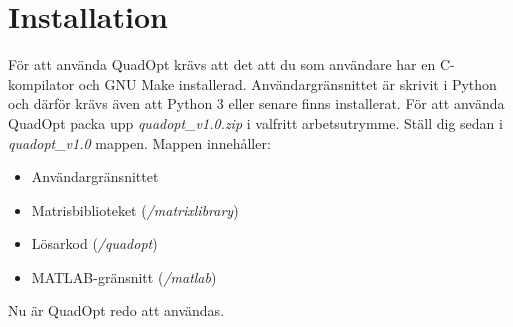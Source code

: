 \section{Installation}
För att använda QuadOpt krävs att det att du som användare har en C-kompilator och GNU Make installerad. Användargränsnittet är skrivit i Python och därför krävs även att Python 3 eller senare finns installerat.
\newline
\newline
För att använda QuadOpt packa upp \emph{quadopt\_v1.0.zip} i valfritt arbetsutrymme. Ställ dig sedan i \emph{quadopt\_v1.0} mappen. Mappen innehåller:

\begin{itemize}
  \item Användargränsnittet 
  \item Matrisbiblioteket (\emph{/matrixlibrary})
  \item Lösarkod (\emph{/quadopt})
  \item MATLAB-gränsnitt (\emph{/matlab}) 
\end{itemize}
Nu är QuadOpt redo att användas.